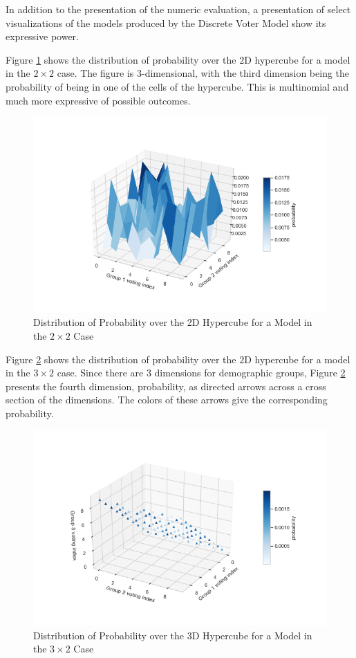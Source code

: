 \documentclass[fleqn,10pt]{style}
\begin{document}
In addition to the presentation of the numeric evaluation, a presentation of select visualizations of the models produced by the Discrete Voter Model show its expressive power.

Figure \ref{fig:2d_viz} shows the distribution of probability over the $2$D hypercube for a model in the $2 \times 2$ case. The figure is $3$-dimensional, with the third dimension being the probability of being in one of the cells of the hypercube. This is multinomial and much more expressive of possible outcomes.

\begin{figure}[ht]\centering
 \includegraphics[width=\linewidth]{images/2d_viz.png}
 \caption{Distribution of Probability over the 2D Hypercube for a Model in the $2 \times 2$ Case}
 \label{fig:2d_viz}
\end{figure}

Figure \ref{fig:3d_viz} shows the distribution of probability over the $2$D hypercube for a model in the $3 \times 2$ case. Since there are $3$ dimensions for demographic groups, Figure \ref{fig:3d_viz} presents the fourth dimension, probability, as directed arrows across a cross section of the dimensions. The colors of these arrows give the corresponding probability.

\begin{figure}[ht]\centering
 \includegraphics[width=\linewidth]{images/3d_viz.png}
 \caption{Distribution of Probability over the 3D Hypercube for a Model in the $3 \times 2$ Case}
 \label{fig:3d_viz}
\end{figure}
\end{document}
